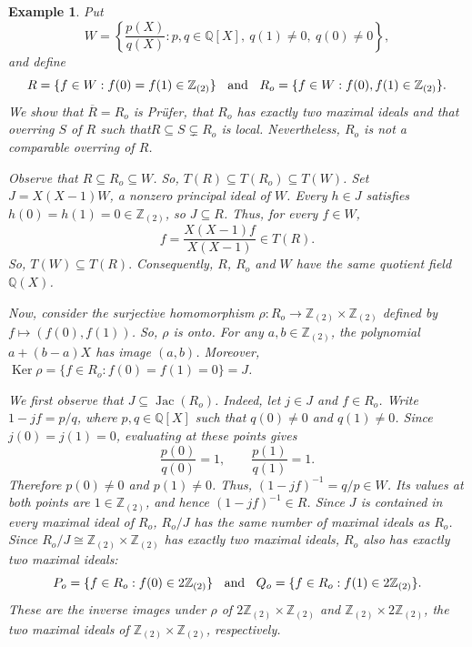 \documentclass[12pt]{article}
\renewcommand{\ker}{\operatorname{Ker}}
\newtheorem{example}{Example}
\begin{document}
	\begin{example}\label{counterexample-problem-29}
		Put
		\[W= \left\{ \frac{p(X)}{q(X)}: p,q\in\mathbb Q[X],\ q(1)\neq0,\ q(0)\neq0 \right\},\]
		and define 
		\[ R=\{f\in W:f(0)=f(1)\in\mathbb Z_{(2)}\} \hspace{2mm}\text{ and }\hspace{2mm} R_o= \{f\in W:f(0),f(1)\in\mathbb Z_{(2)}\}. \]
		We show that $\overline R=R_o$ is Prüfer, that $R_o$ has exactly two maximal ideals and that overring $S$ of $R$ such that$R\subseteq S\subsetneq R_o$ is local. Nevertheless, $R_o$ is not a comparable overring of $R$. 
	
		Observe that \(R\subseteq R_o\subseteq W\). So,  $ T(R) \subseteq T(R_o) \subseteq T(W)$. Set $J=X(X-1)W$, a nonzero principal ideal of $W$.	Every $h\in J$ satisfies $h(0)=h(1)=0 \in\mathbb Z_{(2)} $, so $J\subseteq R$. Thus, for every $f\in W$,
		\[	f=\frac{X(X-1)f}{X(X-1)} \in T(R). \]
		So, $ T(W)\subseteq T(R).$ Consequently, $R$, $R_o$ and $W$ have the same quotient field $\mathbb Q(X)$. 
	
		Now, consider the surjective homomorphism $\rho:R_o\longrightarrow \mathbb Z_{(2)} \times \mathbb Z_{(2)}$ defined by \mbox{$f\longmapsto(f(0),f(1))$}. So, $\rho$ is onto. For any $a,b\in\mathbb Z_{(2)}$, the polynomial $a+(b-a)X$ has image $(a,b)$. Moreover, $\ker\rho=\{f\in R_o:f(0)=f(1)=0\}=J$.
	
		We first observe that $J\subseteq\operatorname{Jac}(R_o)$. Indeed, let $j\in J$ and $f\in R_o$. Write $1-jf=p/q$, where $p,q\in\mathbb Q[X]$ such that $q(0)\neq0$ and $q(1)\neq0$. Since $j(0)=j(1)=0$, evaluating at these points gives 
		\[ \frac{p(0)}{q(0)}=1, \qquad \frac{p(1)}{q(1)}=1. \]
		Therefore $p(0)\neq0$ and $p(1)\neq0$. Thus, $(1-jf)^{-1}=q/p\in W$. Its values at both points are $1\in\mathbb Z_{(2)}$, and hence $(1-jf)^{-1}\in R$. Since $J$ is contained in every maximal ideal of $R_o$, $R_o/J$ has the same number of maximal ideals as $R_o$. Since $R_o/J\cong\mathbb Z_{(2)}\times\mathbb Z_{(2)}$ has exactly two maximal ideals, $R_o$ also has exactly two maximal ideals:
		\[
		P_o=\{f\in R_o:f(0)\in2\mathbb Z_{(2)}\}\hspace{2mm}\text{ and }\hspace{2mm} Q_o=\{f\in R_o:f(1)\in2\mathbb Z_{(2)}\}.
		\]
		These are the inverse images under $\rho$ of $2\mathbb Z_{(2)}\times\mathbb Z_{(2)}$ and $\mathbb Z_{(2)}\times2\mathbb Z_{(2)}$, the two maximal ideals of $\mathbb Z_{(2)}\times\mathbb Z_{(2)}$, respectively.
	

\end{example}
\end{document}
